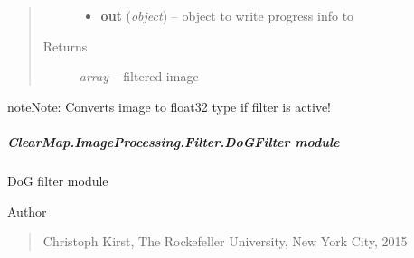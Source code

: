 \documentclass[letterpaper,10pt,english]{sphinxmanual}
\begin{document}
\begin{fulllineitems}
\begin{quote}
\begin{description}
\begin{itemize}
\item {} 
\textbf{out} (\emph{object}) --
object to write progress info to

\end{itemize}

\item[{Returns}] \leavevmode
\emph{array} --
filtered image

\end{description}\end{quote}

\begin{notice}{note}{Note:}
Converts image to float32 type if filter is active!
\end{notice}

\end{fulllineitems}



\subparagraph{ClearMap.ImageProcessing.Filter.DoGFilter module}
\label{api/ClearMap.ImageProcessing.Filter:module-ClearMap.ImageProcessing.Filter.DoGFilter}\label{api/ClearMap.ImageProcessing.Filter:clearmap-imageprocessing-filter-dogfilter-module}
DoG filter module

Author
\begin{quote}

Christoph Kirst, The Rockefeller University, New York City, 2015
\end{quote}
\end{document}
